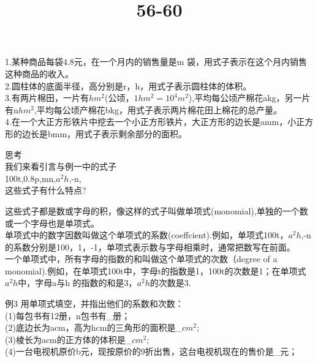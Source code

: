 \documentclass{ctexart}
\title{56-60}
\begin{document}
\maketitle
\begin{article}
\begin{ex}
1.某种商品每袋4.8元，在一个月内的销售量是m 袋，用式子表示在这个月内销售这种商品的收入。\\
2.圆柱体的底面半径，高分别是r，h，用式子表示圆柱体的体积。\\
3.有两片棉田，一片有$hm^{2}$(公顷，$1hm^{2}=10^{4}m^{2}$),平均每公顷产棉花akg，另一片有n$hm^{2}$,平均每公顷产棉花bkg，用式子表示两片棉花田上棉花的总产量。\\
4.在一个大正方形铁片中挖去一个小正方形铁片，大正方形的边长是amm，小正方形的边长是bmm，用式子表示剩余部分的面积。\\
\end{ex}
思考\\
我们来看引言与例一中的式子\\
100t,0.8p,mn,$a^{2}h$,-n,\\
这些式子有什么特点?\\
\begin{concept}
这些式子都是数或字母的积，像这样的式子叫做单项式(monomial),单独的一个数或一个字母也是单项式。\\
单项式中的数字因数叫做这个单项式的系数(coeffcient).例如，单项式100t，$a^{2}h$,-n的系数分别是100，1，-1，单项式表示数与字母相乘时，通常把数写在前面。\\
一个单项式中，所有字母的指数的和叫做这个单项式的次数（degree of a monomial).例如，在单项式100t中，字母t的指数是1，100t的次数是1；在单项式$a^{2}h$中，字母a与h 的指数的和是3，$a^{2}h$的次数是3.\\
\end{concept}
\begin{example}
例3 用单项式填空，并指出他们的系数和次数：\\
(1)每包书有12册，n包书有\_册；\\
(2)底边长为acm，高为hcm的三角形的面积是\_$cm^{2}$;\\
(3)棱长为acm的正方体的体积是\_$cm^{2}$;\\
(4)一台电视机原价b元，现按原价的9折出售，这台电视机现在的售价是\_元；\\
\end{example}
\end{article}
\end{document}
